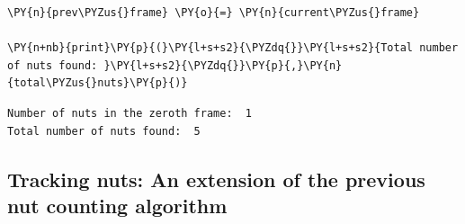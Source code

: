 \documentclass[a4paper,11pt]{article}%
\begin{document}
\begin{tcolorbox}[breakable, size=fbox, boxrule=1pt, pad at break*=1mm,colback=cellbackground, colframe=cellborder]
\begin{Verbatim}[commandchars=\\\{\}]
    \PY{n}{prev\PYZus{}frame} \PY{o}{=} \PY{n}{current\PYZus{}frame}

\PY{n+nb}{print}\PY{p}{(}\PY{l+s+s2}{\PYZdq{}}\PY{l+s+s2}{Total number of nuts found: }\PY{l+s+s2}{\PYZdq{}}\PY{p}{,}\PY{n}{total\PYZus{}nuts}\PY{p}{)}
\end{Verbatim}
\end{tcolorbox}

    \begin{Verbatim}[commandchars=\\\{\}]
Number of nuts in the zeroth frame:  1
Total number of nuts found:  5
    \end{Verbatim}
\subsection{Tracking nuts: An extension of the previous nut counting algorithm}
\end{document}
